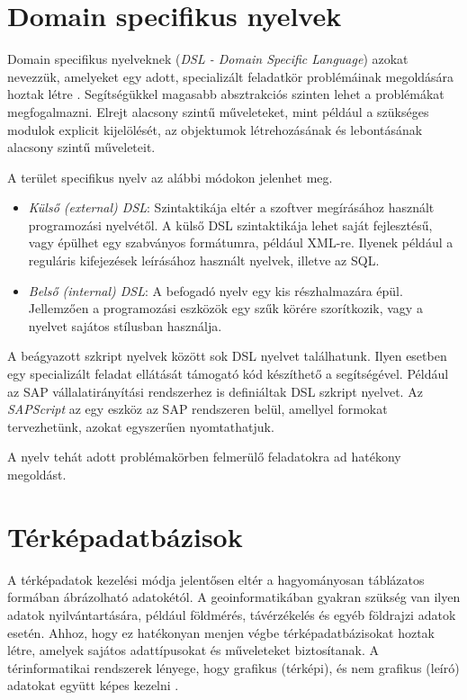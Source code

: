
\section{Domain specifikus nyelvek}

Domain specifikus nyelveknek (\textit{DSL - Domain Specific Language}) azokat nevezzük, amelyeket egy adott, specializált feladatkör problémáinak megoldására hoztak létre \cite{DSL}. Segítségükkel magasabb absztrakciós szinten lehet a problémákat megfogalmazni. Elrejt alacsony szintű műveleteket, mint például a szükséges modulok explicit kijelölését, az objektumok létrehozásának és lebontásának alacsony szintű műveleteit.

A terület specifikus nyelv az alábbi módokon jelenhet meg.

\begin{itemize}
\item \textit{Külső (external) DSL}: Szintaktikája eltér a szoftver megírásához használt programozási nyelvétől. A külső DSL szintaktikája lehet saját fejlesztésű, vagy épülhet egy szabványos formátumra, például XML-re. Ilyenek például a reguláris kifejezések leírásához használt nyelvek, illetve az SQL.
\item \textit{Belső (internal) DSL}: A befogadó nyelv egy kis részhalmazára épül. Jellemzően a programozási eszközök egy szűk körére szorítkozik, vagy a nyelvet sajátos stílusban használja.
\end{itemize}


A beágyazott szkript nyelvek között sok DSL nyelvet találhatunk. Ilyen esetben egy specializált feladat ellátását támogató kód készíthető a segítségével. Például az SAP vállalatirányítási rendszerhez is definiáltak  DSL szkript nyelvet. Az \textit{SAPScript} az egy eszköz az SAP rendszeren belül, amellyel formokat tervezhetünk, azokat egyszerűen nyomtathatjuk.

A nyelv tehát adott problémakörben felmerülő feladatokra ad hatékony megoldást.

\section{Térképadatbázisok}

A térképadatok kezelési módja jelentősen eltér a hagyományosan táblázatos formában ábrázolható adatokétól. A geoinformatikában gyakran szükség van ilyen adatok nyilvántartására, például földmérés, távérzékelés és egyéb földrajzi adatok esetén. Ahhoz, hogy ez hatékonyan menjen végbe térképadatbázisokat hoztak létre, amelyek sajátos adattípusokat és műveleteket biztosítanak.
A térinformatikai rendszerek lényege, hogy grafikus (térképi), és nem grafikus (leíró) adatokat együtt képes kezelni \cite{KE11}.

